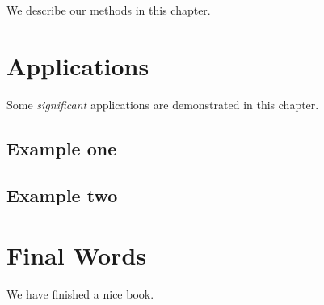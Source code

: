 \documentclass[
]{book}
\begin{document}
We describe our methods in this chapter.

\hypertarget{applications}{%
\chapter{Applications}\label{applications}}

Some \emph{significant} applications are demonstrated in this chapter.

\hypertarget{example-one}{%
\section{Example one}\label{example-one}}

\hypertarget{example-two}{%
\section{Example two}\label{example-two}}

\hypertarget{final-words}{%
\chapter{Final Words}\label{final-words}}

We have finished a nice book.

  
\end{document}
